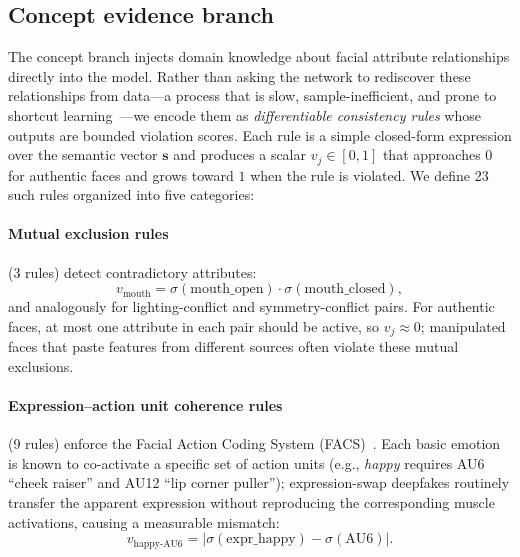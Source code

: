 \documentclass{article}
\begin{document}
\subsection{Concept evidence branch}
\label{sec:concept}

The concept branch injects domain knowledge about facial attribute relationships directly into the model. Rather than asking the network to rediscover these relationships from data---a process that is slow, sample-inefficient, and prone to shortcut learning~\citep{geirhos2020shortcut}---we encode them as \emph{differentiable consistency rules} whose outputs are bounded violation scores. Each rule is a simple closed-form expression over the semantic vector $\bm{s}$ and produces a scalar $v_j \in [0, 1]$ that approaches $0$ for authentic faces and grows toward $1$ when the rule is violated. We define 23 such rules organized into five categories:

\paragraph{Mutual exclusion rules} (3 rules) detect contradictory attributes:
\begin{equation}
  v_\text{mouth} = \sigma(\text{mouth\_open}) \cdot \sigma(\text{mouth\_closed}),
  \label{eq:mutual_excl}
\end{equation}
and analogously for lighting-conflict and symmetry-conflict pairs. For authentic faces, at most one attribute in each pair should be active, so $v_j \approx 0$; manipulated faces that paste features from different sources often violate these mutual exclusions.

\paragraph{Expression--action unit coherence rules} (9 rules) enforce the Facial Action Coding System (FACS)~\citep{ekman1978facial}. Each basic emotion is known to co-activate a specific set of action units (e.g., \emph{happy} requires AU6 ``cheek raiser'' and AU12 ``lip corner puller''); expression-swap deepfakes routinely transfer the apparent expression without reproducing the corresponding muscle activations, causing a measurable mismatch:
\begin{equation}
  v_\text{happy-AU6} = \bigl|\sigma(\text{expr\_happy}) - \sigma(\text{AU6})\bigr|.
  \label{eq:au_rule}
\end{equation}
\end{document}
